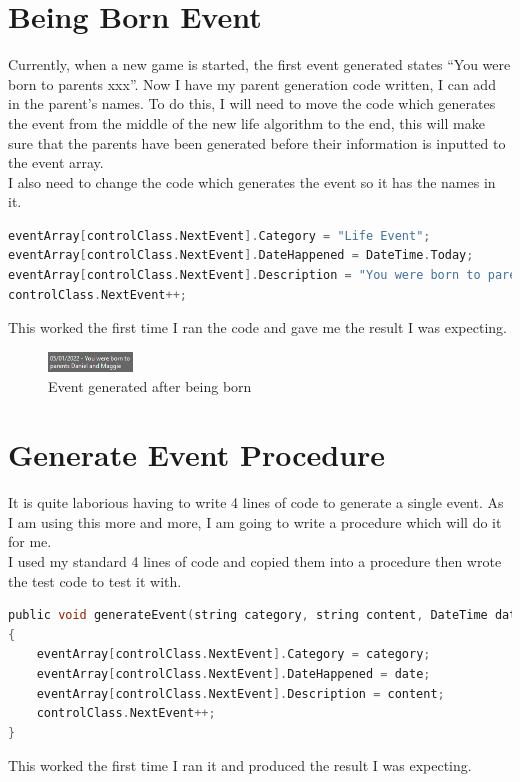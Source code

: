 \section{Being Born Event}
Currently, when a new game is started, the first event generated states “You were born to parents xxx”. Now I have my parent generation code written, I can add in the parent's names. To do this, I will need to move the code which generates the event from the middle of the new life algorithm to the end, this will make sure that the parents have been generated before their information is inputted to the event array.\\
I also need to change the code which generates the event so it has the names in it.
\begin{lstlisting}[language=c, style=csharp, caption=Improved code for the being born event]
eventArray[controlClass.NextEvent].Category = "Life Event";
eventArray[controlClass.NextEvent].DateHappened = DateTime.Today;
eventArray[controlClass.NextEvent].Description = "You were born to parents " + familyArray[0].FirstName + " and " + familyArray[1].FirstName;
controlClass.NextEvent++;
\end{lstlisting}
This worked the first time I ran the code and gave me the result I was expecting.
\begin{figure}[H]
    \centering
    \includegraphics[width=0.2\textwidth]{images/implementation/birthEvent1.png}
    \caption{Event generated after being born}
    \label{fig:implementation-birthEvent1}
\end{figure}

\section{Generate Event Procedure}
It is quite laborious having to write 4 lines of code to generate a single event. As I am using this more and more, I am going to write a procedure which will do it for me.\\
I used my standard 4 lines of code and copied them into a procedure then wrote the test code to test it with.
\begin{lstlisting}[language=c, style=csharp, caption=Code for generateEvent procedure]
public void generateEvent(string category, string content, DateTime date)
{
    eventArray[controlClass.NextEvent].Category = category;
    eventArray[controlClass.NextEvent].DateHappened = date;
    eventArray[controlClass.NextEvent].Description = content;
    controlClass.NextEvent++;
}
\end{lstlisting}
This worked the first time I ran it and produced the result I was expecting.

